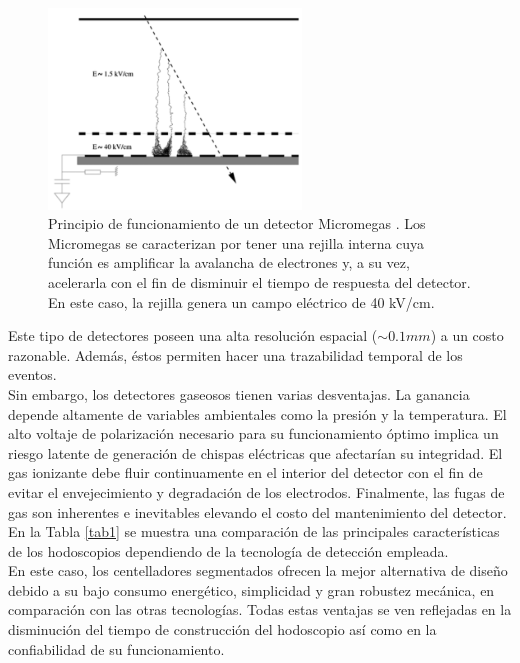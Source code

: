 \begin{figure}[h!]
\begin{center}
\includegraphics[width=0.6\textwidth]{Figures/Micromegas}
\caption[Principio de funcionamiento de un detector Micromegas]{Principio de funcionamiento de un detector Micromegas \cite{Procureur2018}. Los Micromegas se caracterizan por tener una rejilla interna cuya  función es amplificar la avalancha de electrones y, a su vez, acelerarla con el fin de disminuir el tiempo de respuesta del detector. En este caso, la rejilla genera un campo eléctrico de 40 kV/cm.}
\label{RPC}
\end{center}
\end{figure}

Este tipo de detectores poseen una alta resolución espacial ($\sim 0.1 mm$) a un costo razonable. Además, éstos permiten hacer una trazabilidad temporal de los eventos.\\

Sin embargo, los detectores gaseosos tienen varias desventajas. La ganancia depende altamente de variables ambientales como la presión y la temperatura. El alto voltaje de polarización necesario para su funcionamiento óptimo implica un riesgo latente de generación de chispas eléctricas que afectarían su integridad.  El gas ionizante debe fluir continuamente en el interior del detector con el fin de evitar el envejecimiento y degradación de los electrodos. Finalmente, las fugas de gas son inherentes e inevitables  elevando el costo del mantenimiento del detector.\\

En la Tabla \ref{tab1} se muestra una comparación de las principales características de los hodoscopios dependiendo de la tecnología de detección empleada.  \\

En este caso, los centelladores segmentados ofrecen la mejor alternativa de diseño debido a su bajo consumo energético, simplicidad y gran robustez mecánica, en comparación con las otras tecnologías. Todas estas ventajas se ven reflejadas en la disminución del tiempo de construcción del hodoscopio así como en la confiabilidad de su funcionamiento.\\

